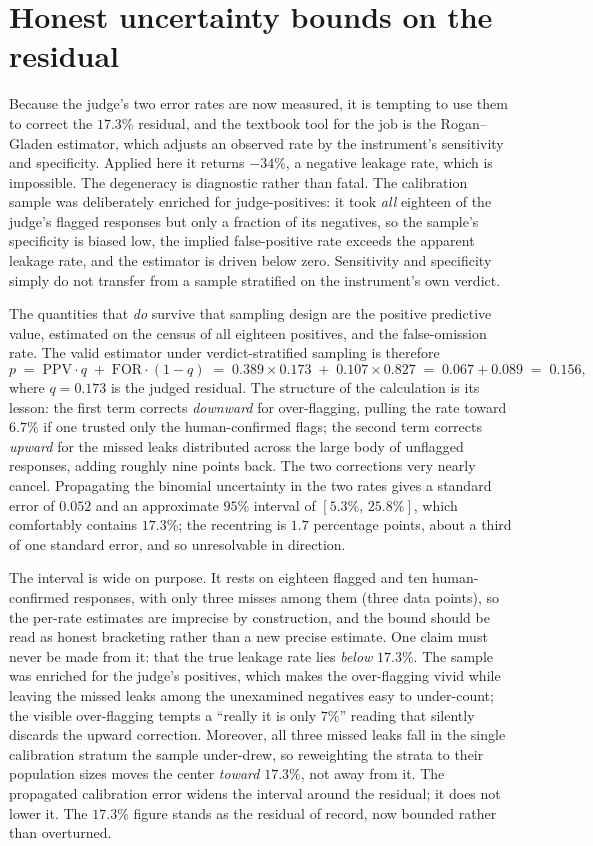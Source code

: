\section{Honest uncertainty bounds on the residual}
\label{sec:ch5-bounds}

Because the judge's two error rates are now measured, it is tempting to use them to correct
the $17.3\%$ residual, and the textbook tool for the job is the Rogan--Gladen estimator,
which adjusts an observed rate by the instrument's sensitivity and specificity. Applied here
it returns $-34\%$, a negative leakage rate, which is impossible. The degeneracy is
diagnostic rather than fatal. The calibration sample was deliberately enriched for
judge-positives: it took \emph{all} eighteen of the judge's flagged responses but only a
fraction of its negatives, so the sample's specificity is biased low, the implied
false-positive rate exceeds the apparent leakage rate, and the estimator is driven below
zero. Sensitivity and specificity simply do not transfer from a sample stratified on the
instrument's own verdict.

The quantities that \emph{do} survive that sampling design are the positive predictive value,
estimated on the census of all eighteen positives, and the false-omission rate. The valid
estimator under verdict-stratified sampling is therefore
\[
  p \;=\; \mathrm{PPV}\cdot q \;+\; \mathrm{FOR}\cdot(1-q)
    \;=\; 0.389 \times 0.173 \;+\; 0.107 \times 0.827
    \;=\; 0.067 + 0.089 \;=\; 0.156,
\]
where $q = 0.173$ is the judged residual. The structure of the calculation is its lesson: the
first term corrects \emph{downward} for over-flagging, pulling the rate toward $6.7\%$ if one
trusted only the human-confirmed flags; the second term corrects \emph{upward} for the missed
leaks distributed across the large body of unflagged responses, adding roughly nine points
back. The two corrections very nearly cancel. Propagating the binomial uncertainty in the two
rates gives a standard error of $0.052$ and an approximate $95\%$ interval of
$[5.3\%,\,25.8\%]$, which comfortably contains $17.3\%$; the recentring is $1.7$ percentage
points, about a third of one standard error, and so unresolvable in direction.

The interval is wide on purpose. It rests on eighteen flagged and ten human-confirmed
responses, with only three misses among them (three data points), so the per-rate estimates
are imprecise by construction, and the bound should be read as honest bracketing rather than a
new precise estimate. One claim must never be made from it: that the true leakage rate lies
\emph{below} $17.3\%$. The sample was enriched for the judge's positives, which makes the
over-flagging vivid while leaving the missed leaks among the unexamined negatives easy to
under-count; the visible over-flagging tempts a ``really it is only $7\%$'' reading that
silently discards the upward correction. Moreover, all three missed leaks fall in the single
calibration stratum the sample under-drew, so reweighting the strata to their population sizes
moves the center \emph{toward} $17.3\%$, not away from it. The propagated calibration error
widens the interval around the residual; it does not lower it. The $17.3\%$ figure stands as
the residual of record, now bounded rather than overturned.

